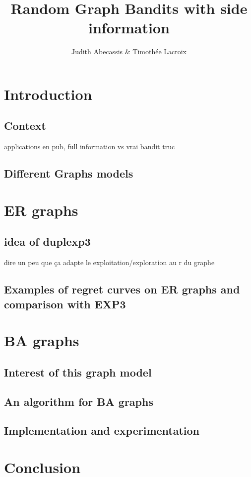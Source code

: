 \documentclass[10pt,a4paper]{scrartcl}
\author{Judith Abecassis \& Timothée Lacroix}
\title{Random Graph Bandits with side information}
\begin{document}
\maketitle

\section{Introduction}
\subsection{Context}
applications en pub, full information vs vrai bandit truc
\subsection{Different Graphs models}

\section{ER graphs}
\subsection{idea of duplexp3}
dire un peu que ça adapte le exploitation/exploration au r du graphe

\subsection{Examples of regret curves on ER graphs and comparison with EXP3}

\section{BA graphs}
\subsection{Interest of this graph model}

\subsection{An algorithm for BA graphs}

\subsection{Implementation and experimentation}

\section{Conclusion}
\end{document}

